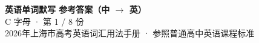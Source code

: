 \documentclass[10pt,a4paper]{article}
\begin{document}
\pagestyle{plain}

\begin{center}
{\LARGE\bfseries 英语单词默写 \quad 参考答案（中 $\to$ 英）}\\[0.22em]
{\large C 字母 · 第 1 / 8 份}\\[0.18em]
{\small 2026年上海市高考英语词汇用法手册 · 参照普通高中英语课程标准}
\end{center}

\vspace{0.2em}
\noindent{\color{rulegray}\rule{\textwidth}{0.8pt}}

\vspace{0.35em}

\vspace{0.25em}
\renewcommand{\arraystretch}{1.32}
\end{document}
